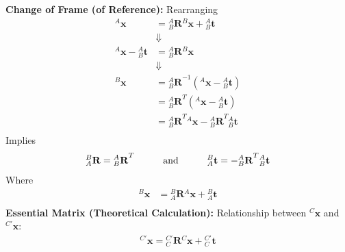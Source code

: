 \documentclass[a4paper,10pt]{article}
\newcommand{\spnhx}[1]{\ensuremath{{^{#1}}\mathbf{{x}}}}
\newcommand{\spppnhx}[3]{\ensuremath{{^{#1}_{#2}}\mathbf{{{#3}}}}}
\begin{document}
\newline\noindent
\textbf{Change of Frame (of Reference):}
\newline\noindent
Rearranging
\begin{equation*}
\begin{split}
\spnhx{A} &= \spppnhx{A}{B}{R}\spnhx{B} + \spppnhx{A}{B}{t}\\
&\Downarrow\\
\spnhx{A} - \spppnhx{A}{B}{t} &= \spppnhx{A}{B}{R}\spnhx{B}\\
&\Downarrow\\
\spnhx{B} &= {\spppnhx{A}{B}{R}}^{-1}\left(\spnhx{A} - \spppnhx{A}{B}{t}\right)\\
&= {\spppnhx{A}{B}{R}}^{T}\left(\spnhx{A} - \spppnhx{A}{B}{t}\right)\\
&= {\spppnhx{A}{B}{R}}^{T}\spnhx{A} - {\spppnhx{A}{B}{R}}^{T}\spppnhx{A}{B}{t}\\
\end{split}
\end{equation*}
\noindent Implies %
\begin{equation*}
\begin{split}
\spppnhx{B}{A}{R}={\spppnhx{A}{B}{R}}^{T}
\indent\indent
\text{and}
\indent\indent
\spppnhx{B}{A}{t}= -{\spppnhx{A}{B}{R}}^{T}\spppnhx{A}{B}{t}\\
\end{split} 
\end{equation*}
\noindent Where
\begin{equation*}
\begin{split}
\spnhx{B} &= \spppnhx{B}{A}{R}\spnhx{A} + \spppnhx{B}{A}{t}\\
\end{split} 
\end{equation*}
\newline\noindent\newline\noindent
\newpage\noindent
\textbf{Essential Matrix (Theoretical Calculation):}
\newline\noindent\newline\noindent
Relationship between $^{C}\mathbf{x}$ and $^{C'}\mathbf{x}$:
\newline\noindent\newline\noindent
\begin{equation*}
\begin{split}
{^{C'}\mathbf{x}} = {\spppnhx{C'}{C}{R}}{^{C}\mathbf{x}}+{\spppnhx{C'}{C}{t}}
\end{split}
\end{equation*}
\end{document}

